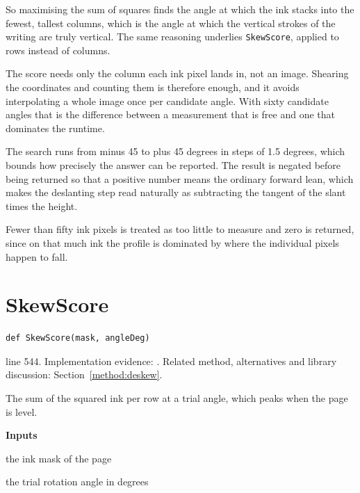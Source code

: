 So maximising the sum of squares finds the angle at which the ink stacks into the fewest, tallest columns, which is the angle at which the vertical strokes of the writing are truly vertical. The same reasoning underlies \texttt{SkewScore}, applied to rows instead of columns.


The score needs only the column each ink pixel lands in, not an image. Shearing the coordinates and counting them is therefore enough, and it avoids interpolating a whole image once per candidate angle. With sixty candidate angles that is the difference between a measurement that is free and one that dominates the runtime.


The search runs from minus 45 to plus 45 degrees in steps of 1.5 degrees, which bounds how precisely the answer can be reported. The result is negated before being returned so that a positive number means the ordinary forward lean, which makes the deslanting step read naturally as subtracting the tangent of the slant times the height.

Fewer than fifty ink pixels is treated as too little to measure and zero is returned, since on that much ink the profile is dominated by where the individual pixels happen to fall.



\section{SkewScore}\label{fn:segment:SkewScore}
\begin{lstlisting}[style=sig]
def SkewScore(mask, angleDeg)
\end{lstlisting}
 line 544. Implementation evidence: \cite{code2026}. Related method, alternatives and library discussion: Section~\ref{method:deskew}.


The sum of the squared ink per row at a trial angle, which peaks when the page is level.




\noindent\textbf{Inputs}
\begin{description}[leftmargin=2.2em,style=nextline,font=\normalfont\ttfamily]\setlength\itemsep{1pt}
  \item[{mask}] \normalfont the ink mask of the page
  \item[{angleDeg}] \normalfont the trial rotation angle in degrees
\end{description}

